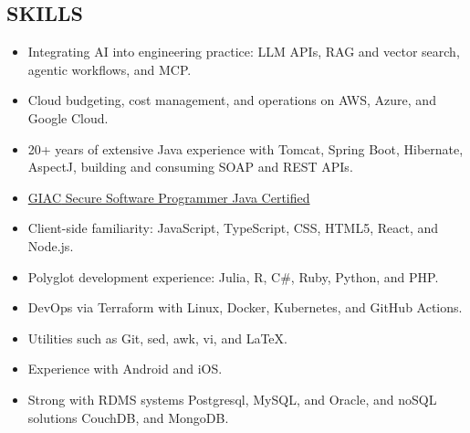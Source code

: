 \documentclass[letterpaper]{article}
\newcommand{\keyword}[1]{\textcolor{BrickRed}{#1}}
\begin{document}
\begin{minipage}[t]{2in}
\begin{flushleft}
\section*{SKILLS}
\begin{itemize}[label=\guilsinglright,leftmargin=*]
	\item Integrating \keyword{AI} into engineering practice: \keyword{LLM} APIs, \keyword{RAG} and vector search, agentic workflows, and \keyword{MCP}.
	\item Cloud budgeting, cost management, and operations on \keyword{AWS}, \keyword{Azure}, and \keyword{Google Cloud}.
	\item 20+ years of extensive Java experience with \keyword{Tomcat}, \keyword{Spring Boot}, \keyword{Hibernate}, \keyword{AspectJ}, building and consuming \keyword{SOAP} and \keyword{REST} APIs.
	\item \href{http://www.giac.org/certification/secure-software-programmer-java-gssp-java}{\keyword{GIAC} Secure Software Programmer Java Certified}
    \item Client-side familiarity: \keyword{JavaScript}, \keyword{TypeScript}, \keyword{CSS}, \keyword{HTML5}, \keyword{React}, and \keyword{Node.js}.
    \item Polyglot development experience: \keyword{Julia}, \keyword{R}, \keyword{C\#}, \keyword{Ruby}, \keyword{Python}, and \keyword{PHP}.
    \item \keyword{DevOps} via \keyword{Terraform} with \keyword{Linux}, \keyword{Docker}, \keyword{Kubernetes}, and \keyword{GitHub Actions}.
    \item Utilities such as \keyword{Git}, \keyword{sed}, \keyword{awk}, \keyword{vi}, and \keyword{{\LaTeX}}.
    \item Experience with \keyword{Android} and \keyword{iOS}.
	\item Strong with RDMS systems \keyword{Postgresql}, \keyword{MySQL}, and \keyword{Oracle}, and noSQL solutions \keyword{CouchDB}, and \keyword{MongoDB}.
\end{itemize}

\end{flushleft}
\end{minipage}
%
\begin{minipage}[h]{.5in}
\
\end{minipage}
%
%
\end{document}
